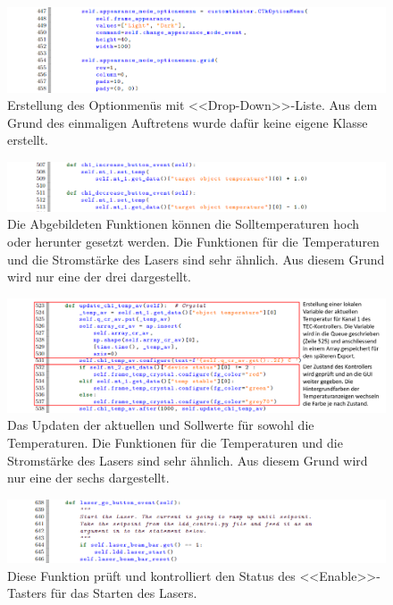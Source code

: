 \begin{appendix}
\begin{landscape}
\begin{figure}[H]
    \centering
    \includegraphics[scale=0.8]{98_images/src/fhnw_pro6m_quellcode_13.png}
    \caption*{Erstellung des Optionmenüs mit <<Drop-Down>>-Liste. Aus dem Grund des einmaligen Auftretens wurde dafür keine eigene Klasse erstellt.}
    \label{fig:fhnw_pro6m_quellcode_13}
\end{figure}

\begin{figure}[H]
    \centering
    \includegraphics[scale=0.8]{98_images/src/fhnw_pro6m_quellcode_15.png}
    \caption*{Die Abgebildeten Funktionen können die Solltemperaturen hoch oder herunter gesetzt werden. Die Funktionen für die Temperaturen und die Stromstärke des Lasers sind sehr ähnlich. Aus diesem Grund wird nur eine der drei dargestellt.}
    \label{fig:fhnw_pro6m_quellcode_15}
\end{figure}

\begin{figure}[H]
    \centering
    \includegraphics[scale=0.8]{98_images/src/fhnw_pro6m_quellcode_16.png}
    \caption*{Das Updaten der aktuellen und Sollwerte für sowohl die Temperaturen. Die Funktionen für die Temperaturen und die Stromstärke des Lasers sind sehr ähnlich. Aus diesem Grund wird nur eine der sechs dargestellt.}
    \label{fig:fhnw_pro6m_quellcode_16}
\end{figure}

\begin{figure}[H]
    \centering
    \includegraphics[scale=0.8]{98_images/src/fhnw_pro6m_quellcode_17.png}
    \caption*{Diese Funktion prüft und kontrolliert den Status des <<Enable>>-Tasters für das Starten des Lasers.}
    \label{fig:fhnw_pro6m_quellcode_17}
\end{figure}


\end{landscape}
\end{appendix}
